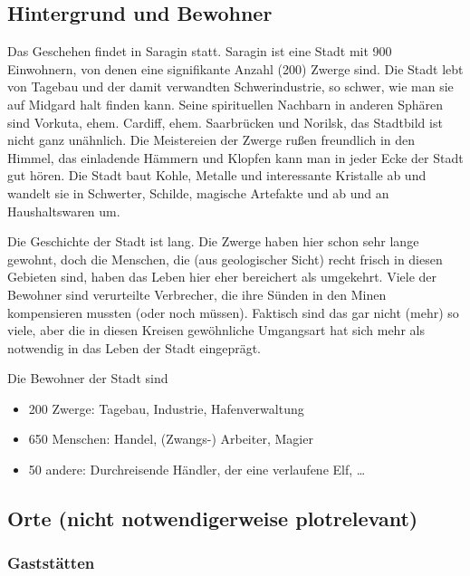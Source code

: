 \documentclass[a4paper,10pt]{scrartcl}
\begin{document}
\subsection{Hintergrund und Bewohner}

Das Geschehen findet in Saragin statt. Saragin ist eine Stadt mit 900
Einwohnern, von denen eine signifikante Anzahl (200) Zwerge sind. Die
Stadt lebt von Tagebau und der damit verwandten Schwerindustrie, so
schwer, wie man sie auf Midgard halt finden kann. Seine spirituellen
Nachbarn in anderen Sphären sind Vorkuta, ehem. Cardiff, ehem.
Saarbrücken und Norilsk, das Stadtbild ist nicht ganz unähnlich. Die
Meistereien der Zwerge rußen freundlich in den Himmel, das einladende
Hämmern und Klopfen kann man in jeder Ecke der Stadt gut hören. Die
Stadt baut Kohle, Metalle und interessante Kristalle ab und wandelt sie
in Schwerter, Schilde, magische Artefakte und ab und an Haushaltswaren
um.

Die Geschichte der Stadt ist lang. Die Zwerge haben hier schon sehr
lange gewohnt, doch die Menschen, die (aus geologischer Sicht) recht
frisch in diesen Gebieten sind, haben das Leben hier eher bereichert als
umgekehrt. Viele der Bewohner sind verurteilte Verbrecher, die ihre
Sünden in den Minen kompensieren mussten (oder noch müssen). Faktisch
sind das gar nicht (mehr) so viele, aber die in diesen Kreisen
gewöhnliche Umgangsart hat sich mehr als notwendig in das Leben der
Stadt eingeprägt.

Die Bewohner der Stadt sind
\begin{itemize}
  \item 200 Zwerge: Tagebau, Industrie, Hafenverwaltung
  \item 650 Menschen: Handel, (Zwangs-) Arbeiter, Magier
  \item 50 andere: Durchreisende Händler, der eine verlaufene Elf, …
\end{itemize}

\subsection{Orte (nicht notwendigerweise plotrelevant)}

\subsubsection{Gaststätten}
\end{document}
